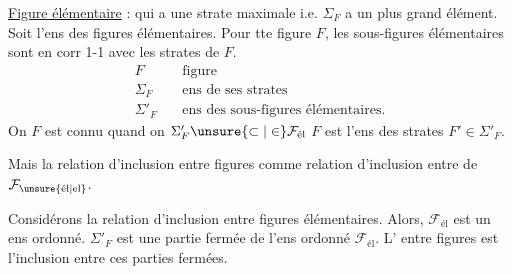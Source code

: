 \uline{Figure élémentaire} : qui a une strate maximale i.e. $\Sigma_F$ a un plus grand élément. Soit  l'ens des figures élémentaires.  Pour tte figure $F$, les sous-figures élémentaires sont en corr 1-1 avec les
strates de $F$. 
\[
\begin{aligned}
 F &\quad \text{figure}\\
 \Sigma_F &\quad \text{ens de ses strates}\\
 \Sigma'_F &\quad \text{ens des sous-figures élémentaires.}
\end{aligned}
\]
On 
$F$ est connu quand on  $\Sigma'_F\unsure{\subset|\in}\mathcal{F}_{\text{él}}$  $F$ est l'ens des strates  $F'\in\Sigma'_F$.

Mais la relation d'inclusion entre figures  comme relation d'inclusion entre  de $\mathcal{F}_{\unsure{\text{él}|\text{el}}}$.


Considérons la relation d'inclusion \inserted{$\leq$} entre figures élémentaires. Alors, $\mathcal{F}_{\text{él}}$ est un ens ordonné.     $\Sigma'_F$ est une partie fermée de l'ens ordonné $\mathcal{F}_{\text{él}}$. L' entre figures est l'inclusion entre ces parties fermées.




